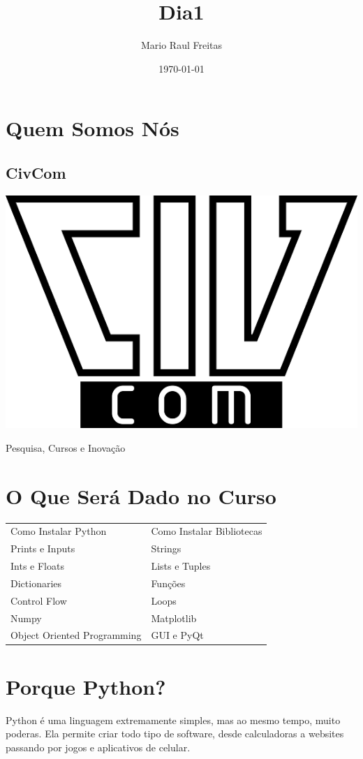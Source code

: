 \documentclass[presentation]{beamer}
\author{Mario Raul Freitas}
\date{\today}
\title{Dia1}
\begin{document}
\maketitle

\section{Quem Somos Nós}
\label{sec:orgheadline2}
\subsection{CivCom}
\label{sec:orgheadline1}
\includegraphics[width=.9\linewidth]{img/Quem Somos Nós/logo2_2016-08-06_17-14-32.png}

Pesquisa, Cursos e Inovação
\section{O Que Será Dado no Curso}
\label{sec:orgheadline3}
\begin{center}
\begin{tabular}{ll}
Como Instalar Python & Como Instalar Bibliotecas\\
Prints e Inputs & Strings\\
Ints e Floats & Lists e Tuples\\
Dictionaries & Funções\\
Control Flow & Loops\\
Numpy & Matplotlib\\
Object Oriented Programming & GUI e PyQt\\
\end{tabular}
\end{center}
\section{Porque Python?}
\label{sec:orgheadline12}
Python é uma linguagem extremamente simples, mas ao mesmo tempo, muito poderas. Ela permite criar todo tipo de software, desde calculadoras a websites passando por jogos e aplicativos de celular.
\end{document}
